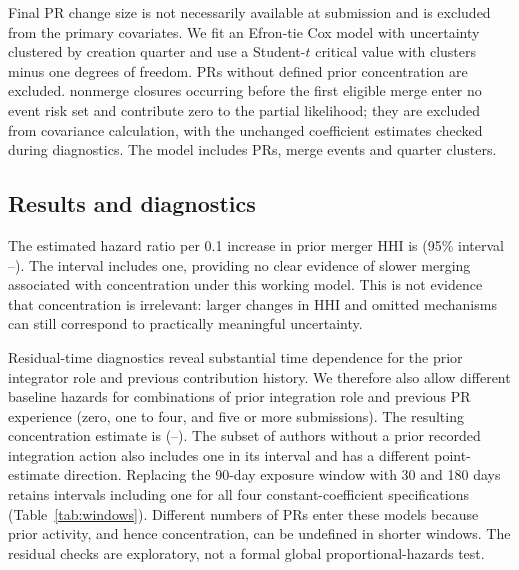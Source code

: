 \documentclass[11pt]{article}
\begin{document}
Final PR change size is not necessarily available at submission and is excluded
from the primary covariates. We fit an Efron-tie Cox model with uncertainty
clustered by creation quarter and use a Student-$t$ critical value with clusters
minus one degrees of freedom. PRs without defined prior concentration are
excluded. \CoxEarlyCensors{} nonmerge closures occurring before the first eligible merge
enter no event risk set and contribute zero to the partial likelihood; they are
excluded from covariance calculation, with the unchanged coefficient estimates
checked during diagnostics. The model includes \CoxObservationCount{} PRs,
\CoxMergeEventCount{} merge events and \CoxQuarterClusters{} quarter clusters.

\begin{table}[tb]
\centering\small
\caption{Exploratory cause-specific merge associations. Intervals use
quarter-clustered uncertainty; proportional-hazards and confounding limitations
apply. Estimates are not causal effects.}
\label{tab:models}
\end{table}

\subsection{Results and diagnostics}
The estimated hazard ratio per 0.1 increase in prior merger HHI is
\CoxConcentrationHR{} (95\% interval
\CoxConcentrationLower{}--\CoxConcentrationUpper{}).
The interval includes one, providing no clear evidence of slower merging
associated with concentration under this working model. This is not evidence
that concentration is irrelevant: larger changes in HHI and omitted mechanisms
can still correspond to practically meaningful uncertainty.

Residual-time diagnostics reveal substantial time dependence for the prior
integrator role and previous contribution history. We therefore also allow
different baseline hazards for combinations of prior integration role and
previous PR experience (zero, one to four, and five or more submissions).
The resulting concentration estimate is \StratifiedConcentrationHR{}
(\StratifiedConcentrationLower{}--\StratifiedConcentrationUpper{}).
The subset of authors without a prior recorded integration action also includes one in its interval and has
a different point-estimate direction. Replacing the 90-day exposure window with
30 and 180 days retains intervals including one for all four constant-coefficient
specifications (Table~\ref{tab:windows}). Different numbers of PRs enter these
models because prior activity, and hence concentration, can be undefined in
shorter windows. The residual checks are exploratory, not a formal global
proportional-hazards test.
\end{document}
